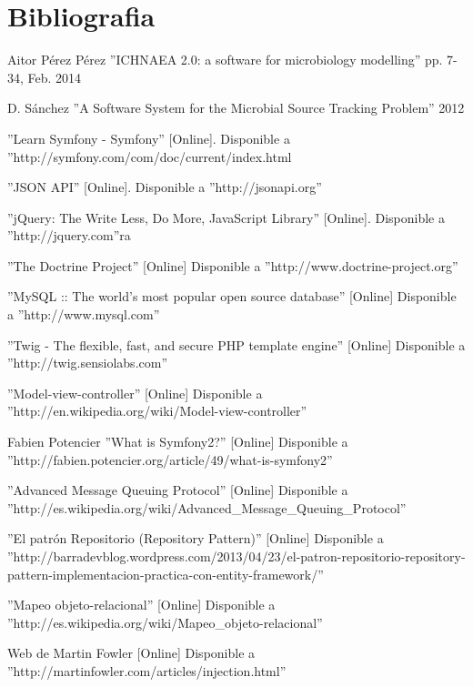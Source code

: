 \chapter{Bibliografia}
\label{cha:bibliografia}
\begin{thebibliography}{100}
Aitor P\'{e}rez P\'{e}rez ''ICHNAEA 2.0: a software for microbiology modelling'' pp. 7-34, Feb. 2014

D. S\'{a}nchez ''A Software System for the Microbial Source Tracking Problem'' 2012

 ''Learn Symfony - Symfony'' [Online]. Disponible a ''http://symfony.com/com/doc/current/index.html

 ''JSON API''  [Online]. Disponible a ''http://jsonapi.org''

 ''jQuery: The Write Less, Do More, JavaScript Library'' [Online]. Disponible a ''http://jquery.com''ra

 ''The Doctrine Project'' [Online] Disponible a ''http://www.doctrine-project.org''

 ''MySQL :: The world's most popular open source database'' [Online] Disponible a ''http://www.mysql.com''

 ''Twig - The flexible, fast, and secure PHP template engine''  [Online] Disponible a ''http://twig.sensiolabs.com''

 ''Model-view-controller'' [Online] Disponible a ''http://en.wikipedia.org/wiki/Model-view-controller''

 Fabien Potencier ''What is Symfony2?'' [Online] Disponible a  ''http://fabien.potencier.org/article/49/what-is-symfony2''

 ''Advanced Message Queuing Protocol'' [Online] Disponible a ''http://es.wikipedia.org/wiki/Advanced\_Message\_Queuing\_Protocol''

 ''El patr\'{o}n Repositorio (Repository Pattern)'' [Online] Disponible a  ''http://barradevblog.wordpress.com/2013/04/23/el-patron-repositorio-repository-pattern-implementacion-practica-con-entity-framework/''

 ''Mapeo objeto-relacional'' [Online] Disponible a ''http://es.wikipedia.org/wiki/Mapeo\_objeto-relacional''

 Web de Martin Fowler [Online] Disponible a ''http://martinfowler.com/articles/injection.html''


\end{thebibliography}

